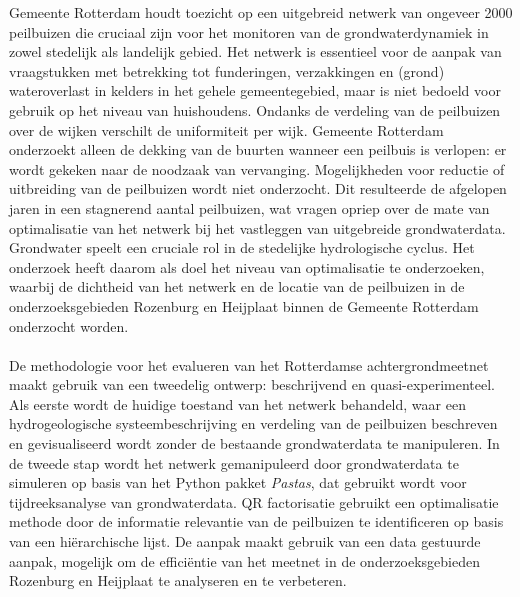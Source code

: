 Gemeente Rotterdam houdt toezicht op een uitgebreid netwerk van ongeveer 2000 peilbuizen die cruciaal zijn voor het monitoren van de grondwaterdynamiek in zowel stedelijk als landelijk gebied. Het netwerk is essentieel voor de aanpak van vraagstukken met betrekking tot funderingen, verzakkingen en (grond) wateroverlast in kelders in het gehele gemeentegebied, maar is niet bedoeld voor gebruik op het niveau van huishoudens. Ondanks de verdeling van de peilbuizen over de wijken verschilt de uniformiteit per wijk. Gemeente Rotterdam onderzoekt alleen de dekking van de buurten wanneer een peilbuis is verlopen: er wordt gekeken naar de noodzaak van vervanging. Mogelijkheden voor reductie of uitbreiding van de peilbuizen wordt niet onderzocht. Dit resulteerde de afgelopen jaren in een stagnerend aantal peilbuizen, wat vragen opriep over de mate van optimalisatie van het netwerk bij het vastleggen van uitgebreide grondwaterdata. Grondwater speelt een cruciale rol in de stedelijke hydrologische cyclus. Het onderzoek heeft daarom als doel het niveau van optimalisatie te onderzoeken, waarbij de dichtheid van het netwerk en de locatie van de peilbuizen in de onderzoeksgebieden Rozenburg en Heijplaat binnen de Gemeente Rotterdam onderzocht worden. \\
\\
De methodologie voor het evalueren van het Rotterdamse achtergrondmeetnet maakt gebruik van een tweedelig ontwerp: beschrijvend en quasi-experimenteel. Als eerste wordt de huidige toestand van het netwerk behandeld, waar een hydrogeologische systeembeschrijving en verdeling van de peilbuizen beschreven en gevisualiseerd wordt zonder de bestaande grondwaterdata te manipuleren. In de tweede stap wordt het netwerk gemanipuleerd door grondwaterdata te simuleren op basis van het Python pakket \textit{Pastas}, dat gebruikt wordt voor tijdreeksanalyse van grondwaterdata. QR factorisatie gebruikt een optimalisatie methode door de informatie relevantie van de peilbuizen te identificeren op basis van een hiërarchische lijst. De aanpak maakt gebruik van een data gestuurde aanpak, mogelijk om de efficiëntie van het meetnet in de onderzoeksgebieden Rozenburg en Heijplaat te analyseren en te verbeteren. \\
\\
